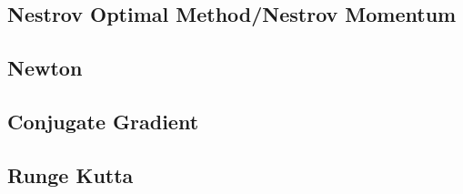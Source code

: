 \subsection{Nestrov Optimal Method/Nestrov Momentum}

\subsection{Newton}

\subsection{Conjugate Gradient}

\subsection{Runge Kutta}



\endinput